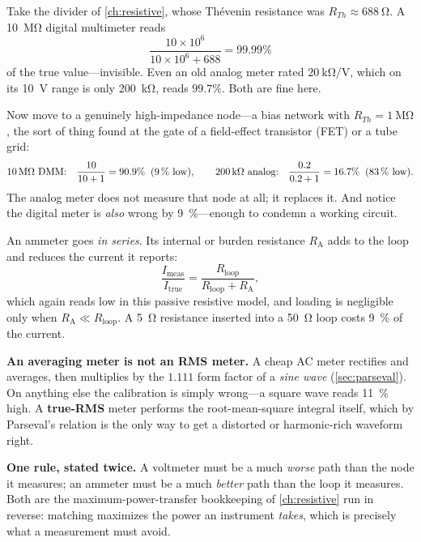 \begin{workedbox}
Take the divider of \cref{ch:resistive}, whose Th\'evenin resistance was
\(R_{Th}\approx\SI{688}{\ohm}\). A \SI{10}{\mega\ohm} digital multimeter reads
\[
\frac{10\times10^6}{10\times10^6+688}=99.99\%
\]
of the true value---invisible. Even an old analog meter rated
\(\SI{20}{\kilo\ohm\per\volt}\), which on its \SI{10}{\volt} range is only
\SI{200}{\kilo\ohm}, reads \(99.7\%\). Both are fine here.

Now move to a genuinely high-impedance node---a bias network with
\(R_{Th}=\SI{1}{\mega\ohm}\), the sort of thing found at the gate of a field-effect
transistor (FET) or a tube grid:
\[
\text{\SI{10}{\mega\ohm} DMM:}\quad \frac{10}{10+1}=90.9\%
\;\;(\SI{9}{\percent}\text{ low}),
\qquad
\text{\SI{200}{\kilo\ohm} analog:}\quad \frac{0.2}{0.2+1}=16.7\%
\;\;(\SI{83}{\percent}\text{ low}).
\]
The analog meter does not measure that node at all; it replaces it. And notice the
digital meter is \emph{also} wrong by \SI{9}{\percent}---enough to condemn a working
circuit.
\end{workedbox}

An ammeter goes \emph{in series}. Its internal or burden resistance
\(R_{\mathrm{A}}\) adds to the loop and reduces the current it reports:
\[
\frac{I_{\text{meas}}}{I_{\text{true}}}
=\frac{R_{\text{loop}}}{R_{\text{loop}}+R_{\mathrm{A}}} ,
\]
which again reads low in this passive resistive model, and loading is negligible only
when \(R_{\mathrm{A}}\ll R_{\text{loop}}\). A \SI{5}{\ohm} resistance inserted into a
\SI{50}{\ohm} loop costs \SI{9}{\percent} of the current.

\begin{mistakebox}
\textbf{An averaging meter is not an RMS meter.} A cheap AC meter rectifies and
averages, then multiplies by the \(1.111\) form factor of a \emph{sine wave}
(\cref{sec:parseval}). On anything else the calibration is simply wrong---a square
wave reads \SI{11}{\percent} high. A \textbf{true-RMS} meter performs the
root-mean-square integral itself, which by Parseval's relation is the only way to get
a distorted or harmonic-rich waveform right.
\end{mistakebox}

\begin{controlsbox}
\textbf{One rule, stated twice.} A voltmeter must be a much \emph{worse} path than
the node it measures; an ammeter must be a much \emph{better} path than the loop it
measures. Both are the maximum-power-transfer bookkeeping of \cref{ch:resistive} run
in reverse: matching maximizes the power an instrument \emph{takes}, which is
precisely what a measurement must avoid.
\end{controlsbox}

